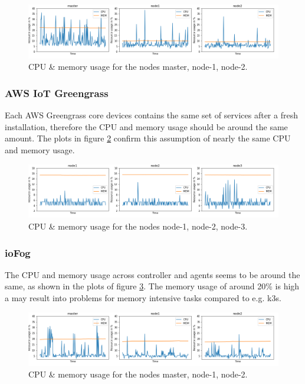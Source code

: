 \begin{figure}[H]
    \centering
    \includegraphics[width=\textwidth]{assets/k3s/logs/plots/results.png}
    \caption{CPU \& memory usage for the nodes master, node-1, node-2.}\label{fig:performance-k3s}
\end{figure}
    
\subsubsection*{AWS IoT Greengrass}
Each AWS Greengrass core devices contains the same set of services after a fresh installation, therefore the CPU and memory usage should be around the same amount. The plots in figure \ref{fig:performance-aws} confirm this assumption of nearly the same CPU and memory usage.

\begin{figure}[H]
    \centering
    \includegraphics[width=\textwidth]{assets/aws-greengrass/logs/plots/results.png}
    \caption{CPU \& memory usage for the nodes node-1, node-2, node-3.}\label{fig:performance-aws}
\end{figure}

\subsubsection*{ioFog}
The CPU and memory usage across controller and agents seems to be around the same, as shown in the plots of figure \ref{fig:performance-ioFog}. The memory usage of around 20\% is high a may result into problems for memory intensive tasks compared to e.g. k3s.

\begin{figure}[H]
    \centering
    \includegraphics[width=\textwidth]{assets/iofog/logs/plots/results.png}
    \caption{CPU \& memory usage for the nodes master, node-1, node-2.}\label{fig:performance-ioFog}
\end{figure}

